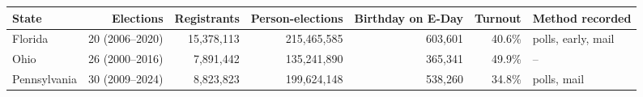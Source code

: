 \begin{tabular}{lrrrrrl}
\toprule
State & Elections & Registrants & Person-elections & Birthday on E-Day & Turnout & Method recorded \\
\midrule
Florida & 20 (2006--2020) & 15,378,113 & 215,465,585 & 603,601 & 40.6\% & polls, early, mail \\
Ohio & 26 (2000--2016) & 7,891,442 & 135,241,890 & 365,341 & 49.9\% & -- \\
Pennsylvania & 30 (2009--2024) & 8,823,823 & 199,624,148 & 538,260 & 34.8\% & polls, mail \\
\bottomrule
\end{tabular}
